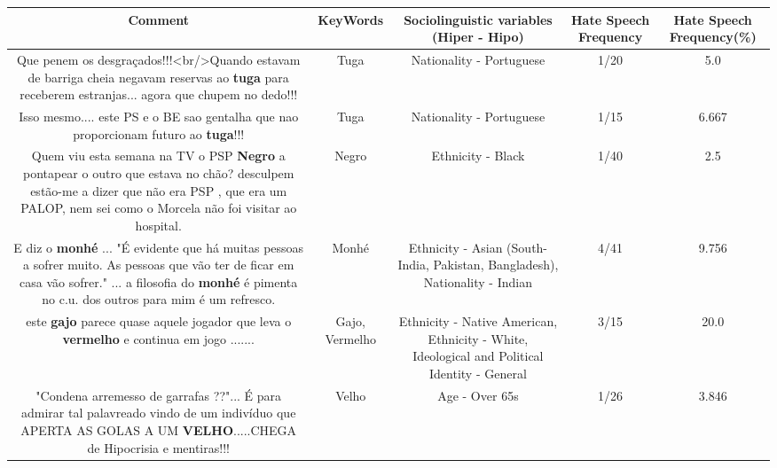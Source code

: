 \documentclass[11pt]{article}
\newlength\mylength
\begin{document}
\begin{center}
\setlength\mylength{\dimexpr\textwidth - 1\arrayrulewidth - 50\tabcolsep}
\begin{longtable}{|C{.65\mylength}|C{.30\mylength}|C{.12\mylength}|C{.12\mylength}|C{.12\mylength}|}
\hline
\textbf{Comment} & \textbf{KeyWords} & \textbf{Sociolinguistic variables (Hiper - Hipo)}  & \textbf{Hate Speech Frequency} & \textbf{Hate Speech Frequency(\%)} \\
\hline{}\small Que penem os desgraçados!!!<br/>Quando estavam de barriga cheia negavam reservas ao \textbf{tuga} para receberem estranjas... agora que chupem no dedo!!!\normalsize   & Tuga & Nationality - Portuguese & 1/20 & 5.0 \\  \hline
  \small Isso mesmo.... este PS e o BE sao gentalha que nao proporcionam futuro ao \textbf{tuga}!!!\normalsize   & Tuga & Nationality - Portuguese & 1/15 & 6.667 \\  \hline
  \small Quem viu esta semana na TV o PSP \textbf{Negro} a pontapear o outro que estava no chão? desculpem estão-me a dizer que não era PSP , que era um PALOP, nem sei como o Morcela não foi visitar ao hospital.\normalsize   & Negro & Ethnicity - Black & 1/40 & 2.5 \\  \hline
  \small E diz o \textbf{m\textbf{onhé}} ... "É evidente que há muitas pessoas a sofrer muito. As pessoas que vão ter de ficar em casa vão sofrer." ... a filosofia do \textbf{m\textbf{onhé}} é pimenta no c.u. dos outros para mim é um refresco.\normalsize   & Monhé & Ethnicity - Asian (South- India, Pakistan, Bangladesh), Nationality - Indian & 4/41 & 9.756 \\  \hline
  \small este  \textbf{gajo}  parece  quase aquele  jogador  que  leva  o \textbf{v\textbf{ermelho}}  e  continua  em  jogo  .......\normalsize   & Gajo, Vermelho & Ethnicity - Native American, Ethnicity - White, Ideological and Political Identity - General & 3/15 & 20.0 \\  \hline
  \small "Condena arremesso de garrafas ??"... É para admirar tal palavreado vindo de um indivíduo que APERTA AS GOLAS A UM \textbf{VELHO}.....CHEGA de Hipocrisia e mentiras!!!\normalsize   & Velho & Age - Over 65s & 1/26 & 3.846 \\  \hline

\end{longtable}
\end{center}
\end{document}
